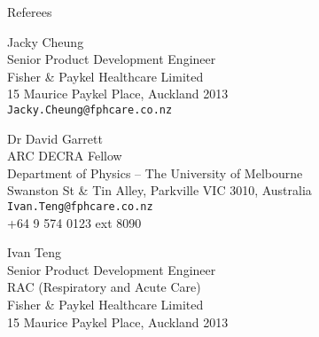 \documentclass[11pt]{tracv}
\begin{document}
\begin{columnsection}{Referees}

\begin{multicols}{2}

    	Jacky Cheung\\
	Senior Product Development Engineer\\ 
	Fisher \& Paykel Healthcare Limited\\
	15 Maurice Paykel Place, Auckland 2013\\ 
	\texttt{Jacky.Cheung@fphcare.co.nz}\\

	\vspace{0.25cm}

	Dr David Garrett\\
	ARC DECRA Fellow\\
	Department of Physics -- The University of Melbourne\\
	Swanston St & Tin Alley, Parkville VIC 3010, Australia\\
	\texttt{Ivan.Teng@fphcare.co.nz}\\
	+64 9 574 0123 ext 8090\\

	\vspace{0.25cm}
	\columnbreak

	Ivan Teng\\
	Senior Product Development Engineer\\
	RAC (Respiratory and Acute Care)\\
	Fisher \& Paykel Healthcare Limited\\
	15 Maurice Paykel Place, Auckland 2013\\

\end{multicols}

\end{columnsection}
\end{document}
